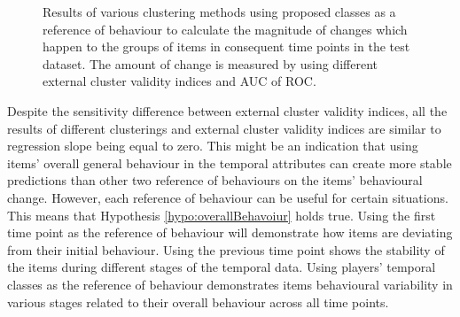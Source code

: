 \begin{figure}[!h]
\begin{minipage}{\dimexpr \textwidth-2\fboxsep-2\fboxrule}
                \end{minipage}            
                \caption{Results of various clustering methods using proposed classes as a reference of behaviour to calculate the magnitude of changes which happen to the groups of items in consequent time points in the test dataset. The amount of change  is measured by using different external cluster validity indices and AUC of ROC.}
                \label{fig:test_ChangeMeasuers_Class_PGG10}
            \end{figure}

Despite the sensitivity difference between external cluster validity indices, all the results of different clusterings and external cluster validity indices are similar to regression slope being equal to zero. This might be an indication that using items' overall general behaviour in the temporal attributes can create more stable predictions than other two reference of behaviours on the items' behavioural change. However, each reference of behaviour can be useful for certain situations. This means that Hypothesis \ref{hypo:overallBehavoiur} holds true. Using the first time point as the reference of behaviour will demonstrate how items are deviating from their initial behaviour. Using the previous time point shows the stability of the items during different stages of the temporal data. Using players' temporal classes as the reference of behaviour demonstrates items behavioural variability in various stages related to their overall behaviour across all time points.


